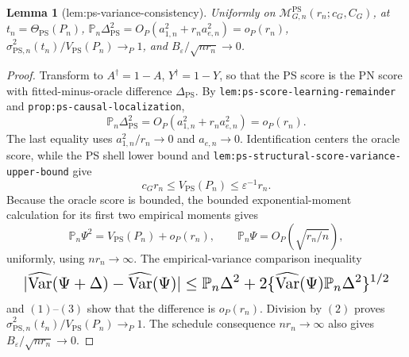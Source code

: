\documentclass{article}
\newtheorem{lemma}{Lemma}
\begin{document}
\begin{lemma}[lem:ps-variance-consistency]\label{lem:ps-variance-consistency}
Uniformly on \(\mathcal M_{G,n}^{\mathrm{PS}}(r_n;c_G,C_G)\), at \(t_n=\Theta_{\mathrm{PS}}(P_n)\), \(\mathbb P_n\Delta_{\mathrm{PS}}^2=O_P(a_{1,n}^2+r_na_{e,n}^2)=o_P(r_n)\), \(\widehat\sigma_{\mathrm{PS},n}^2(t_n)/V_{\mathrm{PS}}(P_n)\to_P1\), and \(B_\varepsilon/\sqrt{nr_n}\to0\).
\end{lemma}
\begin{proof}
Transform to \(A^\dagger=1-A\), \(Y^\dagger=1-Y\), so that the PS score is the PN score with fitted-minus-oracle difference \(\Delta_{\mathrm{PS}}\). By \texttt{lem:ps-score-learning-remainder} and \texttt{prop:ps-causal-localization},
\[\mathbb P_n\Delta_{\mathrm{PS}}^2=O_P(a_{1,n}^2+r_na_{e,n}^2)=o_P(r_n).\tag{1}\]
The last equality uses \(a_{1,n}^2/r_n\to0\) and \(a_{e,n}\to0\). Identification centers the oracle score, while the PS shell lower bound and \texttt{lem:ps-structural-score-variance-upper-bound} give
\[c_Gr_n\le V_{\mathrm{PS}}(P_n)\le\varepsilon^{-1}r_n.\tag{2}\]
Because the oracle score is bounded, the bounded exponential-moment calculation for its first two empirical moments gives
\[\mathbb P_n\Psi^2=V_{\mathrm{PS}}(P_n)+o_P(r_n),\qquad \mathbb P_n\Psi=O_P(\sqrt{r_n/n}),\tag{3}\]
uniformly, using \(nr_n\to\infty\). The empirical-variance comparison inequality
\[
\makebox[\linewidth][c]{\resizebox{0.98\linewidth}{!}{\par\noindent \makebox[\linewidth][c]{\resizebox{0.98\linewidth}{!}{\(\displaystyle \displaystyle |\widehat{\operatorname{Var}}(\Psi+\Delta)-\widehat{\operatorname{Var}}(\Psi)|\le\mathbb P_n\Delta^2+2\{\widehat{\operatorname{Var}}(\Psi)\mathbb P_n\Delta^2\}^{1/2}\)}}\par\noindent}}
\]
and \((1)\)--\((3)\) show that the difference is \(o_P(r_n)\). Division by \((2)\) proves \(\widehat\sigma_{\mathrm{PS},n}^2(t_n)/V_{\mathrm{PS}}(P_n)\to_P1\). The schedule consequence \(nr_n\to\infty\) also gives \(B_\varepsilon/\sqrt{nr_n}\to0\).
\end{proof}
\end{document}
